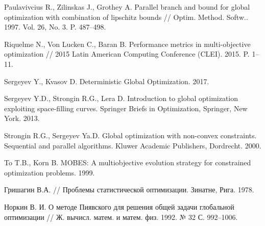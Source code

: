 \documentclass{cmi}
\begin{document}
\begin{biblio_lat}
{Paulavivcius R., Zilinskas J., Grothey A.}
\newblock Parallel branch and bound for global optimization with combination of
  lipschitz bounds //
\newblock Optim. Method. Softw.. 1997. Vol. 26, No. 3. P. 487--498.
\newblock {}

{Riquelme} N., {Von Lucken} C., {Baran} B.
\newblock Performance metrics in multi-objective optimization
\newblock // 2015 Latin American Computing Conference (CLEI). 2015. P. 1--11.
\newblock {}

Sergeyev Y., Kvasov D. Deterministic Global Optimization. 2017.
\newblock {}

{Sergeyev Y.D., Strongin R.G., Lera D.} Introduction to global optimization
  exploiting space-filling curves.
\newblock Springer Briefs in Optimization, Springer, New York. 2013.
\newblock {}

{Strongin R.G., Sergeyev Ya.D.} Global optimization with non-convex
  constraints. Sequential and parallel algorithms.
\newblock Kluwer Academic Publishers, Dordrecht. 2000.
\newblock {}

To T.B., Korn B.
\newblock MOBES: A multiobjective evolution strategy for constrained
  optimization problems. 1999.

{Гришагин В.А.}
\newblock // Проблемы статистической
  оптимизации. Зинатне, Рига. 1978.

{Норкин В. И.}
\newblock О методе Пиявского для решения общей
  задачи глобальной оптимизации //
\newblock Ж. вычисл. матем. и матем. физ. 1992. № 32 С. 992--1006.

\end{biblio_lat}
\end{document}
